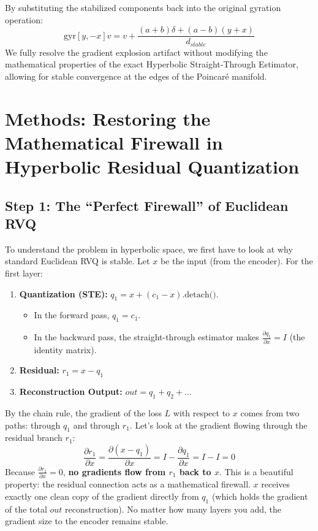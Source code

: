 \documentclass{article}
\begin{document}
By substituting the stabilized components back into the original gyration operation:
\begin{equation}
    \text{gyr}[y, -x]v = v + \frac{(a+b)\delta + (a-b)(y+x)}{d_{stable}}
\end{equation}
We fully resolve the gradient explosion artifact without modifying the mathematical properties of the exact Hyperbolic Straight-Through Estimator, allowing for stable convergence at the edges of the Poincaré manifold.

\section*{Methods: Restoring the Mathematical Firewall in Hyperbolic Residual Quantization}

\subsection*{Step 1: The ``Perfect Firewall'' of Euclidean RVQ}
To understand the problem in hyperbolic space, we first have to look at why standard Euclidean RVQ is stable. Let $x$ be the input (from the encoder). For the first layer:
\begin{enumerate}
    \item \textbf{Quantization (STE):} $q_1 = x + (c_1 - x)\text{.detach()}$. 
    \begin{itemize}
        \item In the forward pass, $q_1 = c_1$. 
        \item In the backward pass, the straight-through estimator makes $\frac{\partial q_1}{\partial x} = I$ (the identity matrix).
    \end{itemize}
    \item \textbf{Residual:} $r_1 = x - q_1$
    \item \textbf{Reconstruction Output:} $out = q_1 + q_2 + \dots$
\end{enumerate}

By the chain rule, the gradient of the loss $L$ with respect to $x$ comes from two paths: through $q_1$ and through $r_1$. Let's look at the gradient flowing through the residual branch $r_1$:
\begin{equation}
    \frac{\partial r_1}{\partial x} = \frac{\partial (x - q_1)}{\partial x} = I - \frac{\partial q_1}{\partial x} = I - I = 0
\end{equation}
Because $\frac{\partial r_1}{\partial x} = 0$, \textbf{no gradients flow from $r_1$ back to $x$}. This is a beautiful property: the residual connection acts as a mathematical firewall. $x$ receives exactly one clean copy of the gradient directly from $q_1$ (which holds the gradient of the total $out$ reconstruction). No matter how many layers you add, the gradient size to the encoder remains stable.
\end{document}
